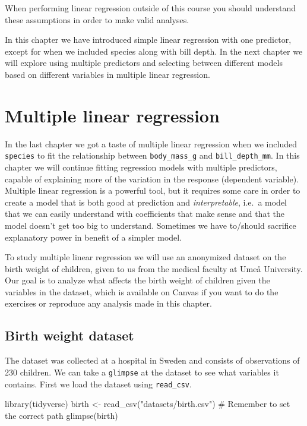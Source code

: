 \documentclass[
  letterpaper,
  DIV=11,
  numbers=noendperiod]{scrreprt}
\newenvironment{Shaded}{\begin{snugshade}}{\end{snugshade}}
\newcommand{\CommentTok}[1]{\textcolor[rgb]{0.37,0.37,0.37}{#1}}
\newcommand{\FunctionTok}[1]{\textcolor[rgb]{0.28,0.35,0.67}{#1}}
\newcommand{\NormalTok}[1]{\textcolor[rgb]{0.00,0.23,0.31}{#1}}
\newcommand{\OtherTok}[1]{\textcolor[rgb]{0.00,0.23,0.31}{#1}}
\newcommand{\StringTok}[1]{\textcolor[rgb]{0.13,0.47,0.30}{#1}}
\begin{document}
When performing linear regression outside of this course you should
understand these assumptions in order to make valid analyses.

In this chapter we have introduced simple linear regression with one
predictor, except for when we included species along with bill depth. In
the next chapter we will explore using multiple predictors and selecting
between different models based on different variables in multiple linear
regression.

\chapter{Multiple linear regression}\label{sec-multlinreg}

In the last chapter we got a taste of multiple linear regression when we
included \texttt{species} to fit the relationship between
\texttt{body\_mass\_g} and \texttt{bill\_depth\_mm}. In this chapter we
will continue fitting regression models with multiple predictors,
capable of explaining more of the variation in the response (dependent
variable). Multiple linear regression is a powerful tool, but it
requires some care in order to create a model that is both good at
prediction and \emph{interpretable}, i.e.~a model that we can easily
understand with coefficients that make sense and that the model doesn't
get too big to understand. Sometimes we have to/should sacrifice
explanatory power in benefit of a simpler model.

To study multiple linear regression we will use an anonymized dataset on
the birth weight of children, given to us from the medical faculty at
Umeå University. Our goal is to analyze what affects the birth weight of
children given the variables in the dataset, which is available on
Canvas if you want to do the exercises or reproduce any analysis made in
this chapter.

\section{Birth weight dataset}\label{birth-weight-dataset}

The dataset was collected at a hospital in Sweden and consists of
observations of 230 children. We can take a \texttt{glimpse} at the
dataset to see what variables it contains. First we load the dataset
using \texttt{read\_csv}.

\begin{Shaded}
\begin{Highlighting}[]
\FunctionTok{library}\NormalTok{(tidyverse)}
\NormalTok{birth }\OtherTok{\textless{}{-}} \FunctionTok{read\_csv}\NormalTok{(}\StringTok{"datasets/birth.csv"}\NormalTok{) }\CommentTok{\# Remember to set the correct path}
\FunctionTok{glimpse}\NormalTok{(birth)}
\end{Highlighting}
\end{Shaded}
\end{document}
